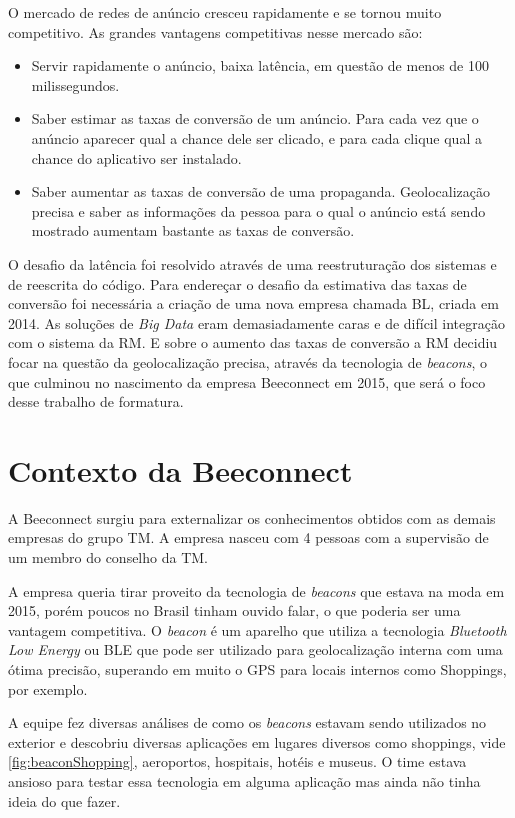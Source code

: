 O mercado de redes de anúncio cresceu rapidamente e se tornou muito competitivo. As grandes vantagens competitivas nesse mercado são:
\begin{itemize}
\item Servir rapidamente o anúncio, baixa latência, em questão de menos de 100 milissegundos.
\item Saber estimar as taxas de conversão de um anúncio. Para cada vez que o anúncio aparecer qual a chance dele ser clicado, e para cada clique qual a chance do aplicativo ser instalado.
\item Saber aumentar as taxas de conversão de uma propaganda. Geolocalização precisa e saber as informações da pessoa para o qual o anúncio está sendo mostrado aumentam bastante as taxas de conversão.
\end{itemize}

O desafio da latência foi resolvido através de uma reestruturação dos sistemas e de reescrita do código. Para endereçar o desafio da estimativa das taxas de conversão foi necessária a criação de uma nova empresa chamada BL, criada em 2014. As soluções de \textit{Big Data} eram demasiadamente caras e de difícil integração com o sistema da RM. E sobre o aumento das taxas de conversão a RM decidiu focar na questão da geolocalização precisa, através da tecnologia de \textit{beacons}, o que culminou no nascimento da empresa Beeconnect em 2015, que será o foco desse trabalho de formatura.

\section{Contexto da Beeconnect}
\label{cha:contexto_da_beeconnect}
A Beeconnect surgiu para externalizar os conhecimentos obtidos com as demais empresas do grupo TM. A empresa nasceu com 4 pessoas com a supervisão de um membro do conselho da TM.

A empresa queria tirar proveito da tecnologia de \textit{beacons} que estava na moda em 2015, porém poucos no Brasil tinham ouvido falar, o que poderia ser uma vantagem competitiva. O \textit{beacon} é um aparelho que utiliza a tecnologia \textit{Bluetooth Low Energy} ou BLE que pode ser utilizado para geolocalização interna com uma ótima precisão, superando em muito o GPS para locais internos como Shoppings, por exemplo.

A equipe fez diversas análises de como os \textit{beacons} estavam sendo utilizados no exterior e descobriu diversas aplicações em lugares diversos como shoppings, vide \autoref{fig:beaconShopping}, aeroportos, hospitais, hotéis e museus. O time estava ansioso para testar essa tecnologia em alguma aplicação mas ainda não tinha ideia do que fazer.

